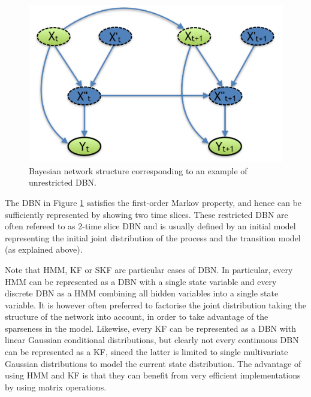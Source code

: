 \begin{figure}
\begin{center}
\includegraphics[scale=0.45]{./figures/PreliminariesDBN}
\caption{\label{Figure:DBN}Bayesian network structure corresponding to an example of  unrestricted DBN.}
\end{center}
\end{figure}

The DBN in Figure \ref{Figure:DBN} satisfies the first-order Markov property, and hence can be sufficiently represented by showing two time slices. These restricted DBN are often refereed to as 2-time slice DBN and is usually defined by an initial model representing the initial joint distribution of the process and the transition model (as explained above). 




Note that HMM, KF or SKF are particular cases of DBN. In particular, every HMM can be represented as a DBN with a single state variable and every discrete DBN as a HMM combining all hidden variables into a single state variable. It is however often preferred to factorise the joint distribution taking the structure of the network into account, in order to take advantage of the sparseness in the model. Likewise, every KF can be represented as a DBN with linear Gaussian conditional distributions, but clearly not every continuous DBN can be represented as a KF, sinced the latter is limited to single multivariate Gaussian distributions to model the current state distribution. The advantage of using HMM and KF is that they can benefit from very efficient implementations by using matrix operations.

